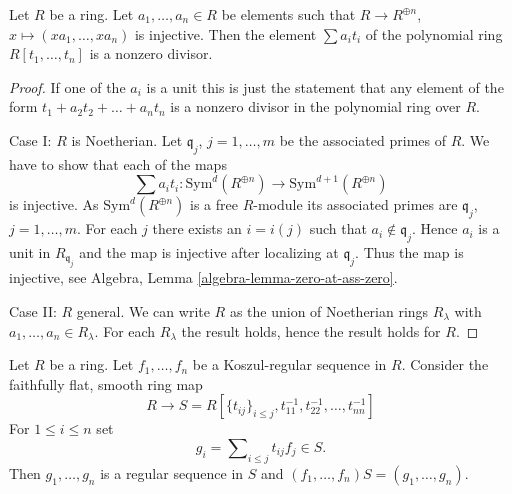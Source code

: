 \begin{lemma}
\label{lemma-make-nonzero-divisor}
Let $R$ be a ring. Let $a_1, \ldots, a_n \in R$ be elements such
that $R \to R^{\oplus n}$, $x \mapsto (xa_1, \ldots, xa_n)$ is injective.
Then the element $\sum a_i t_i$ of the polynomial ring $R[t_1, \ldots, t_n]$
is a nonzero divisor.
\end{lemma}

\begin{proof}
If one of the $a_i$ is a unit this is just the statement that any
element of the form $t_1 + a_2 t_2 + \ldots + a_n t_n$ is a nonzero
divisor in the polynomial ring over $R$.

\medskip\noindent
Case I: $R$ is Noetherian. Let $\mathfrak q_j$, $j = 1, \ldots, m$
be the associated primes of $R$. We have to show that
each of the maps
$$
\sum a_i t_i :
\text{Sym}^d(R^{\oplus n})
\longrightarrow
\text{Sym}^{d + 1}(R^{\oplus n})
$$
is injective. As $\text{Sym}^d(R^{\oplus n})$ is a free $R$-module its
associated primes are $\mathfrak q_j$, $j = 1, \ldots, m$. For each
$j$ there exists an $i = i(j)$ such that $a_i \not \in \mathfrak q_j$.
Hence $a_i$ is a unit in $R_{\mathfrak q_j}$ and the map is injective
after localizing at $\mathfrak q_j$. Thus the map is injective, see
Algebra, Lemma \ref{algebra-lemma-zero-at-ass-zero}.

\medskip\noindent
Case II: $R$ general. We can write $R$ as the union of Noetherian
rings $R_\lambda$ with $a_1, \ldots, a_n \in R_\lambda$. For each $R_\lambda$
the result holds, hence the result holds for $R$.
\end{proof}

\begin{lemma}
\label{lemma-Koszul-regular-flat-locally-regular}
Let $R$ be a ring. Let $f_1, \ldots, f_n$ be a Koszul-regular sequence
in $R$. Consider the faithfully flat, smooth ring map
$$
R \longrightarrow
S = R[\{t_{ij}\}_{i \leq j}, t_{11}^{-1}, t_{22}^{-1}, \ldots, t_{nn}^{-1}]
$$
For $1 \leq i \leq n$ set
$$
g_i = \sum\nolimits_{i \leq j} t_{ij} f_j \in S.
$$
Then $g_1, \ldots, g_n$ is a regular sequence in $S$ and
$(f_1, \ldots, f_n)S = (g_1, \ldots, g_n)$.
\end{lemma}

